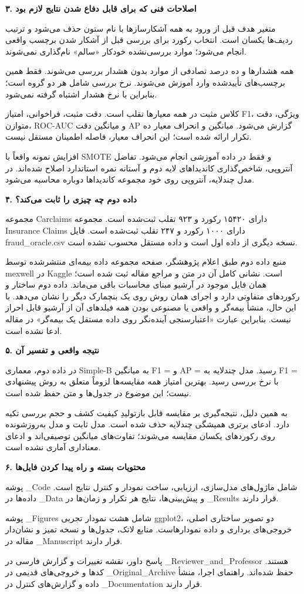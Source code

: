 \documentclass[11pt,a4paper]{article}
\newcommand{\lr}[1]{{\latinfont\beginL#1\endL}}
\newcommand{\fa}[1]{\par\begingroup\raggedleft\noindent\beginR#1\endR\par\endgroup}
\newcommand{\fatitle}[1]{\fa{\large\bfseries #1}\medskip}
\begin{document}
\newpage
\fatitle{۳. اصلاحات فنی که برای قابل دفاع شدن نتایج لازم بود}
\fa{متغیر هدف قبل از ورود به همه آشکارسازها با نام ستون حذف می‌شود و ترتیب ردیف‌ها یکسان است. انتخاب رکورد برای بررسی قبل از آشکار شدن برچسب واقعی انجام می‌شود؛ موارد بررسی‌نشده خودکار «سالم» نام‌گذاری نمی‌شوند.}
\fa{همه هشدارها و ده درصد تصادفی از موارد بدون هشدار بررسی می‌شوند. فقط همین برچسب‌های تأییدشده وارد آموزش می‌شوند. نرخ بررسی شامل هر دو گروه است؛ بنابراین با نرخ هشدار اشتباه گرفته نمی‌شود.}
\fa{کلاس مثبت در همه معیارها تقلب است. دقت مثبت، فراخوانی، امتیاز \lr{F1}، ویژگی، دقت متوازن، \lr{ROC-AUC} و میانگین دقت \lr{AP} گزارش می‌شود. میانگین و انحراف معیار ده تکرار ارائه شده است؛ این انحراف معیار، فاصله اطمینان مستقل نیست.}
\fa{افزایش نمونه واقعاً با \lr{SMOTE} و فقط در داده آموزشی انجام می‌شود. تفاضل آنتروپی، شاخص‌گذاری کاندیداهای لایه دوم و آستانه نمره استاندارد اصلاح شده‌اند. در مدل چندلایه، آنتروپی روی خود مجموعه کاندیداها دوباره محاسبه می‌شود.}

\fatitle{۴. داده دوم چه چیزی را ثابت می‌کند؟}
\fa{مجموعه \lr{Carclaims} دارای ۱۵۴۲۰ رکورد و ۹۲۳ تقلب ثبت‌شده است. مجموعه \lr{Insurance Claims} دارای ۱۰۰۰ رکورد و ۲۴۷ تقلب ثبت‌شده است. فایل \lr{fraud\_oracle.csv} نسخه دیگری از داده اول است و داده مستقل محسوب نشده است.}
\fa{منبع داده دوم طبق اعلام پژوهشگر، صفحه مجموعه داده بیمه‌ای منتشرشده توسط \lr{mexwell} در \lr{Kaggle} است. نشانی کامل آن در متن و مراجع مقاله ثبت شده است؛ همان فایل موجود در آرشیو مبنای محاسبات باقی می‌ماند. داده دوم ساختار و رکوردهای متفاوتی دارد و اجرای همان روش روی یک بنچمارک دیگر را نشان می‌دهد. با این حال، منشأ بیمه‌گر و واقعی یا مصنوعی بودن همه فیلدهای آن از آرشیو قابل احراز نیست. بنابراین عبارت «اعتبارسنجی آینده‌نگر روی داده مستقل یک بیمه‌گر» در مقاله ادعا نشده است.}

\fatitle{۵. نتیجه واقعی و تفسیر آن}
\fa{در داده دوم، معماری \lr{Simple-B} به میانگین \lr{F1 = \ExtSimpleBFone} و \lr{AP = \ExtSimpleBAP} رسید. مدل چندلایه به \lr{F1 = \ExtMultiFone} با نرخ بررسی \lr{\ExtMultiReview} رسید. بهترین امتیاز همه مقایسه‌ها لزوماً متعلق به روش پیشنهادی نیست؛ این موضوع در جدول‌ها و متن حفظ شده است.}
\fa{به همین دلیل، نتیجه‌گیری بر مقایسه قابل بازتولیدِ کیفیت کشف و حجم بررسی تکیه دارد. ادعای برتری همیشگی چندلایه حذف شده است. مدل ثابت و مدل به‌روزشونده روی رکوردهای یکسان مقایسه می‌شوند؛ تفاوت‌های میانگین توصیفی‌اند و ادعای معناداری آماری نشده است.}

\newpage
\fatitle{۶. محتویات بسته و راه پیدا کردن فایل‌ها}
\fa{پوشه \lr{01\_Code} شامل ماژول‌های مدل‌سازی، ارزیابی، ساخت نمودار و کنترل نتایج است. داده‌ها در \lr{02\_Data} و پیش‌بینی‌ها، نتایج هر تکرار و زمان‌ها در \lr{03\_Results} قرار دارند.}
\fa{پوشه \lr{04\_Figures} شامل هشت نمودار تجربی \lr{ggplot2}، دو تصویر ساختاری اصلی، خروجی‌های برداری و داده نمودارهاست. منابع لاتک، جدول‌ها و نسخه تمیز و نشان‌دار مقاله در \lr{05\_Manuscript} قرار دارند.}
\fa{پاسخ داور، نقشه تغییرات و گزارش فارسی در \lr{06\_Reviewer\_and\_Professor} هستند. کدها و خروجی‌های قدیمی در \lr{07\_Original\_Archive} حفظ شده‌اند. راهنمای اجرا، منشأ داده و گزارش‌های کنترل در \lr{08\_Documentation} قرار دارند.}
\end{document}
